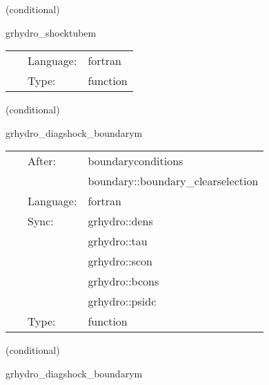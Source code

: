 \documentclass{article}
\begin{document}
\vspace{5mm}

   (conditional) 

\hspace{5mm} grhydro\_shocktubem 

\hspace{5mm}{\it shocktube initial data - mhd version } 


\hspace{5mm}

 \begin{tabular*}{160mm}{cll} 
~ & Language:  & fortran \\ 
~ & Type:  & function \\ 
\end{tabular*} 


\vspace{5mm}

   (conditional) 

\hspace{5mm} grhydro\_diagshock\_boundarym 

\hspace{5mm}{\it diagonal shock boundary conditions } 


\hspace{5mm}

 \begin{tabular*}{160mm}{cll} 
~ & After:  & boundaryconditions \\ 
~& ~ &boundary::boundary\_clearselection\\ 
~ & Language:  & fortran \\ 
~ & Sync:  & grhydro::dens \\ 
~& ~ &grhydro::tau\\ 
~& ~ &grhydro::scon\\ 
~& ~ &grhydro::bcons\\ 
~& ~ &grhydro::psidc\\ 
~ & Type:  & function \\ 
\end{tabular*} 


\vspace{5mm}

   (conditional) 

\hspace{5mm} grhydro\_diagshock\_boundarym 

\hspace{5mm}{\it diagonal shock boundary conditions } 
\end{document}
